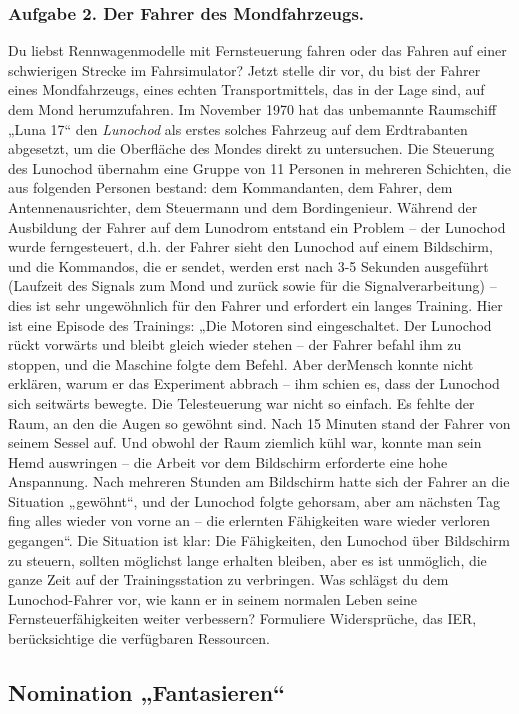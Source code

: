 \documentclass[11pt,a4paper]{article}
\begin{document}
\subsubsection*{Aufgabe 2. Der Fahrer des Mondfahrzeugs.}
Du liebst Rennwagenmodelle mit Fernsteuerung fahren oder das Fahren auf einer
schwierigen Strecke im Fahrsimulator?  Jetzt stelle dir vor, du bist der
Fahrer eines Mondfahrzeugs, eines echten Transportmittels, das in der Lage
sind, auf dem Mond herumzufahren. Im November 1970 hat das unbemannte
Raumschiff „Luna 17“ den \emph{Lunochod} als erstes solches Fahrzeug auf dem
Erdtrabanten abgesetzt, um die Oberfläche des Mondes direkt zu untersuchen.
Die Steuerung des Lunochod übernahm eine Gruppe von 11 Personen in mehreren
Schichten, die aus folgenden Personen bestand: dem Kommandanten, dem Fahrer,
dem Antennenausrichter, dem Steuermann und dem Bordingenieur. Während der
Ausbildung der Fahrer auf dem Lunodrom entstand ein Problem -- der Lunochod
wurde ferngesteuert, d.h. der Fahrer sieht den Lunochod auf einem Bildschirm,
und die Kommandos, die er sendet, werden erst nach 3-5 Sekunden ausgeführt
(Laufzeit des Signals zum Mond und zurück sowie für die Signalverarbeitung) --
dies ist sehr ungewöhnlich für den Fahrer und erfordert ein langes Training.
Hier ist eine Episode des Trainings: „Die Motoren sind eingeschaltet. Der
Lunochod rückt vorwärts und bleibt gleich wieder stehen -- der Fahrer befahl
ihm zu stoppen, und die Maschine folgte dem Befehl.  Aber derMensch konnte
nicht erklären, warum er das Experiment abbrach -- ihm schien es, dass der
Lunochod sich seitwärts bewegte.  Die Telesteuerung war nicht so einfach.  Es
fehlte der Raum, an den die Augen so gewöhnt sind. Nach 15 Minuten stand der
Fahrer von seinem Sessel auf. Und obwohl der Raum ziemlich kühl war, konnte
man sein Hemd auswringen -- die Arbeit vor dem Bildschirm erforderte eine hohe
Anspannung. Nach mehreren Stunden am Bildschirm hatte sich der Fahrer an die
Situation „gewöhnt“, und der Lunochod folgte gehorsam, aber am nächsten Tag
fing alles wieder von vorne an -- die erlernten Fähigkeiten ware wieder
verloren gegangen“.  Die Situation ist klar: Die Fähigkeiten, den Lunochod
über Bildschirm zu steuern, sollten möglichst lange erhalten bleiben, aber es
ist unmöglich, die ganze Zeit auf der Trainingsstation zu verbringen. Was
schlägst du dem Lunochod-Fahrer vor, wie kann er in seinem normalen Leben
seine Fernsteuerfähigkeiten weiter verbessern?  Formuliere Widersprüche, das
IER, berücksichtige die verfügbaren Ressourcen.

\subsection{Nomination „Fantasieren“}
\end{document}
